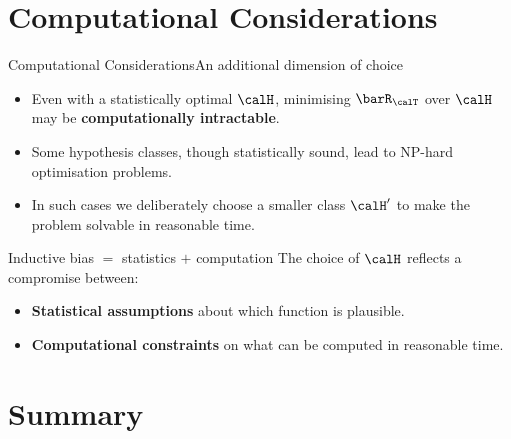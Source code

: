 \section{Computational Considerations}

\begin{frame}{Computational Considerations}{An additional dimension of choice}
  \begin{itemize}
    \item Even with a statistically optimal $\calH$, minimising $\barR_\calT$ over $\calH$
          may be \textcolor{AccentBlue}{\textbf{computationally intractable}}.
    \item Some hypothesis classes, though statistically sound, lead to NP-hard optimisation
          problems.
    \item In such cases we deliberately choose a smaller class $\calH'$ to make the problem
          solvable in reasonable time.
  \end{itemize}
  \bigskip
  \begin{block}{Inductive bias $=$ statistics $+$ computation}
    The choice of $\calH$ reflects a compromise between:
    \begin{itemize}
      \item \textbf{Statistical assumptions} about which function is plausible.
      \item \textbf{Computational constraints} on what can be computed in reasonable time.
    \end{itemize}
  \end{block}
\end{frame}

\section{Summary}

